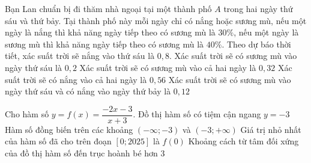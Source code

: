 \cauds
\begin{ex}
	Bạn Lan chuẩn bị đi thăm nhà ngoại tại một thành phố $A$ trong hai ngày thứ sáu và thứ bảy. Tại thành phố này mỗi ngày chỉ có nắng hoặc sương mù, nếu một ngày là nắng thì khả năng ngày tiếp theo có sương mù là $30\%$, nếu một ngày là sương mù thì khả năng ngày tiếp theo có sương mù là $40\%$. Theo dự báo thời tiết, xác suất trời sẽ nắng vào thứ sáu là $0{,}8$.
	\choiceTF	
	{\True Xác suất trời sẽ có sương mù vào ngày thứ sáu là $0{,}2$}
	{Xác suất trời sẽ có sương mù vào cả hai ngày là $0{,}32$}
	{\True Xác suất trời sẽ có nắng vào cả hai ngày là $0{,}56$}
	{\True Xác suất trời sẽ có sương mù vào ngày thứ sáu và có nắng vào ngày thứ bảy là $0{,}12$}
\end{ex}

\begin{ex}
	Cho hàm số $y=f(x)=\dfrac{-2x-3}{x+3}$.
	\choiceTF
	{Đồ thị hàm số có tiệm cận ngang $y=-3$}
	{Hàm số đồng biến trên các khoảng $(-\infty;-3)$ và $(-3;+\infty)$}
	{Giá trị nhỏ nhất của hàm số đã cho trên đoạn $[0;2025]$ là $f(0)$}
	{\True Khoảng cách từ tâm đối xứng của đồ thị hàm số đến trục hoành bé hơn $3$}
\end{ex}

